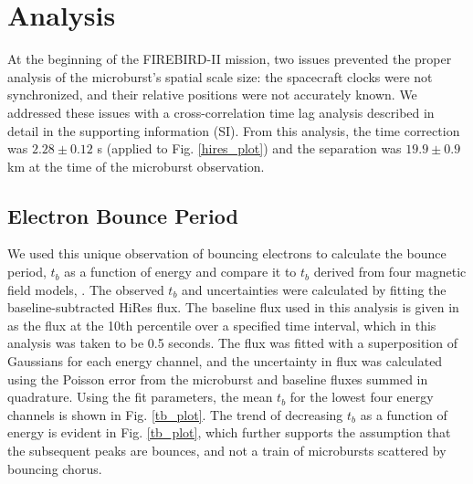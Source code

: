 \documentclass[draft, linenumbers]{agujournal}
\begin{document}
\section{Analysis} \label{analysis} %
At the beginning of the FIREBIRD-II mission, two issues prevented the proper analysis of the microburst's spatial scale size: the spacecraft clocks were not synchronized, and their relative positions were not accurately known. We addressed these issues with a cross-correlation time lag analysis described in detail in the supporting information (SI). From this analysis, the time correction was $2.28 \pm 0.12$ s (applied to Fig. \ref{hires_plot}) and the separation was $19.9 \pm 0.9$ km at the time of the microburst observation.

\subsection{Electron Bounce Period} \label{t_b} %
We used this unique observation of bouncing electrons to calculate the bounce period, $t_b$ as a function of energy and compare it to  $t_b$  derived from four magnetic field models, . The observed $t_b$ and uncertainties were calculated by fitting the baseline-subtracted HiRes flux. The baseline flux used in this analysis is given in \citet{O'Brien2004} as the flux at the 10th percentile over a specified time interval, which in this analysis was taken to be 0.5 seconds. The flux was fitted with a superposition of Gaussians for each energy channel, and the uncertainty in flux was calculated using the Poisson error from the microburst and baseline fluxes summed in quadrature. Using the fit parameters, the mean $t_b$ for the lowest four energy channels is shown in Fig. \ref{tb_plot}. The trend of decreasing $t_b$ as a function of energy is evident in Fig. \ref{tb_plot}, which further supports the assumption that the subsequent peaks are bounces, and not a train of microbursts scattered by bouncing chorus. 
\end{document}
